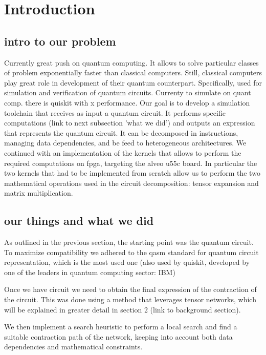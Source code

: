 \documentclass[12pt,oneside,a4paper]{article}
\begin{document}
\newpage
\tableofcontents
\newpage

\section{Introduction}


\subsection{intro to our problem}
Currently great push on quantum computing. It allows to solve particular classes of problem exponentially faster than classical computers. 
Still, classical computers play great role in development of their quantum counterpart. Specifically, used for simulation and verification of quantum circuits. 
Currenty to simulate on quant comp. there is quiskit with x performance.
Our goal is to develop a simulation toolchain that receives as input a quantum circuit. It performs specific computations (link to next subsection 'what we did') and outputs an expression that represents the quantum circuit. It can be decomposed in instructions, managing data dependencies, and be feed to heterogeneous architectures.
We continued with an implementation of the kernels that allows to perform the required computations on fpga, targeting the alveo u55c board. In particular the two kernels that had to be implemented from scratch allow us to perform the two mathematical operations used in the circuit decomposition: tensor expansion and matrix multiplication. 


\subsection{our things and what we did}
As outlined in the previous section, the starting point was the quantum circuit.
To maximize compatibility we adhered to the qasm standard for quantum circuit representation, which is the most used one (also used by quiskit, developed by one of the leaders in quantum computing sector: IBM)

Once we have circuit we need to obtain the final expression of the contraction of the circuit. This was done using a method that leverages tensor networks, which will be explained in greater detail in section 2 (link to background section).

We then implement a search heuristic to perform a local search and find a suitable contraction path of the network, keeping into account both data dependencies and mathematical constraints.
\end{document}
